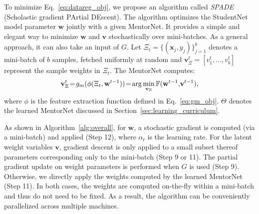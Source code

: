 \documentclass{article}
\begin{document}
To minimize Eq.~\eqref{eq:datareg_obj}, we propose an algorithm called \emph{SPADE} (Scholastic gradient PArtial DEscent). The algorithm optimizes the StudentNet model parameter $\mathbf{w}$ jointly with a given MentorNet. It provides a simple and elegant way to minimize $\mathbf{w}$ and $\mathbf{v}$ stochastically over mini-batches. As a general approach, it can also take an input of $G$. Let $\Xi_t = \{(\mathbf{x}_j, y_j)\}_{j=1}^b$ denotes a mini-batch of $b$ samples, fetched uniformly at random and $\mathbf{v}_{\Xi}^{t} = [v_1^{t}, ... , v_b^{t}]$ represent the sample weights in $\Xi_t$. The MentorNet computes:
\vspace{-1mm}
\begin{equation}
\mathbf{v}_{\Xi}^{t} \!=\! g_m (\phi(\Xi_t, \mathbf{w}^{t-1})) \!=\! \arg\min_{\mathbf{v}_{\Xi}} \mathbb{F} (\mathbf{w}^{t-1},\! \mathbf{v}^{t-1}),
\vspace{-1mm}
\end{equation}
where $\phi$ is the feature extraction function defined in Eq.~\eqref{eq:gm_obj}. $\Theta$ denotes the learned MentorNet discussed in Section~\ref{sec:learning_curriculum}.

As shown in Algorithm~\ref{alg:overall}, for $\mathbf{w}$, a stochastic gradient is computed (via a mini-batch) and applied (Step 12), where $\alpha_t$ is the learning rate. For the latent weight variables $\mathbf{v}$, gradient descent is only applied to a small subset thereof parameters corresponding only to the mini-batch (Step 9 or 11). The partial gradient update on weight parameters is performed when $G$ is used (Step 9). Otherwise, we directly apply the weights computed by the learned MentorNet (Step 11). In both cases, the weights are computed on-the-fly within a mini-batch and thus do not need to be fixed. As a result, the algorithm can be conveniently parallelized across multiple machines.
\end{document}

